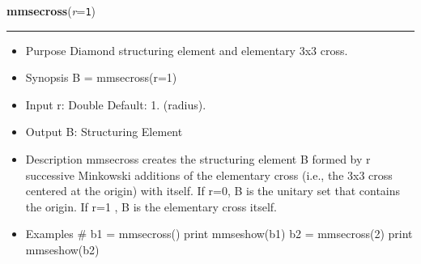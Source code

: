     \begin{boxedminipage}{\textwidth}

    \raggedright \textbf{mmsecross}(\textit{r}=\texttt{1\-})

    \vspace{-1.5ex}

    \rule{\textwidth}{0.5\fboxrule}
    \begin{itemize}
    \setlength{\parskip}{0.6ex}
      \item Purpose Diamond structuring element and elementary 3x3 cross.

      \item Synopsis B = mmsecross(r=1)

      \item Input r: Double Default: 1. (radius).

      \item Output B: Structuring Element

      \item Description mmsecross creates the structuring element B formed by 
        r successive Minkowski additions of the elementary cross (i.e., 
        the 3x3 cross centered at the origin) with itself. If r=0, B is 
        the unitary set that contains the origin. If r=1 , B is the 
        elementary cross itself.

      \item Examples \# b1 = mmsecross() print mmseshow(b1) b2 = mmsecross(2) 
        print mmseshow(b2)

    \end{itemize}

    \vspace{1ex}

    \end{boxedminipage}

    \label{multireg:num_pymorph:mmsedil}
    \vspace{0.5ex}

